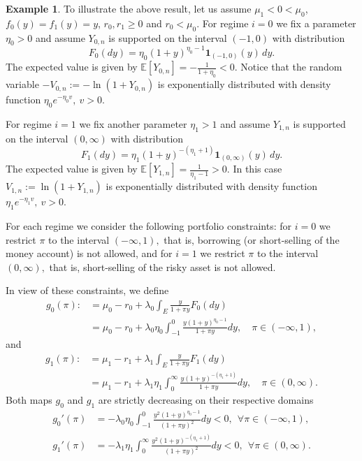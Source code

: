 \documentclass[11pt]{article}
\theoremstyle{plain}
\theoremstyle{definition}
\newtheorem{example}[theorem]{Example}
\numberwithin{equation}{section}
\newcommand{\Exp}{\mathds{E}}
\begin{document}
\begin{example}
To illustrate the above result, let us assume $\mu_1<0<\mu_0$, $f_0(y)=f_1(y)=y$, $r_0,r_1\geq0$ and $r_0<\mu_0$. For regime $i=0$ we fix a parameter $\eta_0>0$ and assume $Y_{0,n}$ is supported on the interval $(-1,0)$ with distribution
\[
F_0(dy)=\eta_0(1+y)^{\eta_0-1}\mathbf{1}_{(-1,0)}(y)\,dy.
\]
The expected value is given by $\Exp[Y_{0,n}]=-\frac{1}{1+\eta_0}<0$. Notice that  the random variable $-V_{0,n}:=-\ln(1+Y_{0,n})$ is exponentially distributed with density function $\eta_0e^{-\eta_0v}, \ v>0.$

For regime $i=1$ we fix another parameter $\eta_1>1$ and assume $Y_{1,n}$ is supported on the interval $(0,\infty)$ with distribution
\[
F_1(dy)=\eta_1(1+y)^{-(\eta_1+1)}\mathbf{1}_{(0,\infty)}(y)\,dy.
\]
The expected value is given by $\Exp[Y_{1,n}]=\frac{1}{\eta_1-1}>0.$ In this case $V_{1,n}:=\ln(1+Y_{1,n})$ is exponentially distributed with density function $\eta_1e^{-\eta_1v}, \ v>0.$

For each regime we consider the following portfolio constraints: for $i=0$ we restrict $\pi$ to the interval $(-\infty,1),$ that is, borrowing (or short-selling of the money account) is not allowed, and for $i=1$ we restrict $\pi$ to the interval $(0,\infty),$ that is, short-selling of the risky asset is not allowed.

In view of these constraints, we define
\begin{equation}
\begin{split}
g_0(\pi):&=\mu_0-r_0+\lambda_0\int_{E}\frac{y}{1+\pi y}F_0(dy) \\
&=\mu_0-r_0+\lambda_0\eta_0\int_{-1}^0\frac{y(1+y)^{\eta_0-1}}{1+\pi y}dy,\quad \pi\in (-\infty,1),
\end{split}
\end{equation}
and
\begin{equation}
\begin{split}
g_1(\pi):&=\mu_1-r_1+\lambda_1\int_{E}\frac{y}{1+\pi y}F_1(dy) \\
&=\mu_1-r_1+\lambda_1\eta_1\int_{0}^\infty\frac{y(1+y)^{-(\eta_1+1)}}{1+\pi y}dy,\quad \pi\in (0,\infty).
\end{split}
\end{equation}
Both maps $g_0$ and $g_1$ are strictly decreasing on their respective domains
\begin{align*}
g_0'(\pi)&=-\lambda_0\eta_0\int_{-1}^0\frac{y^2(1+y)^{\eta_0-1}}{(1+\pi y)^2}dy<0, \ \ \forall \pi\in (-\infty,1), \\
g_1'(\pi)&=-\lambda_1\eta_1\int_{0}^\infty\frac{y^2(1+y)^{-(\eta_1+1)}}{(1+\pi y)^2}dy<0, \ \ \forall \pi\in (0,\infty).
\end{align*}


\end{example}
\end{document}
